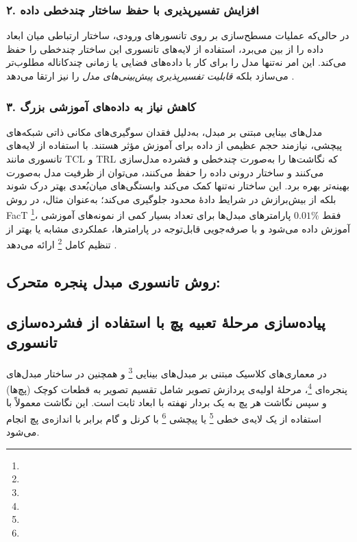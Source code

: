 \subsubsection{۲. \textbf{افزایش تفسیرپذیری با حفظ ساختار چندخطی داده}}

در حالی‌که عملیات مسطح‌سازی بر روی تانسورهای ورودی، ساختار ارتباطی میان ابعاد داده را از بین می‌برد، استفاده از لایه‌های تانسوری این ساختار چندخطی را حفظ می‌کند. این امر نه‌تنها مدل را برای کار با داده‌های فضایی یا زمانی چندکاناله مطلوب‌تر می‌سازد بلکه \emph{قابلیت تفسیرپذیری پیش‌بینی‌های مدل} را نیز ارتقا می‌دهد \cite{hamreras2025tensorization}.

\subsubsection{۳. \textbf{کاهش نیاز به داده‌های آموزشی بزرگ}}

مدل‌های بینایی مبتنی بر مبدل، به‌دلیل فقدان سوگیری‌های مکانی ذاتی شبکه‌های پیچشی، نیازمند حجم عظیمی از داده برای آموزش مؤثر هستند. با استفاده از لایه‌های تانسوری مانند TCL و TRL که نگاشت‌ها را به‌صورت چندخطی و فشرده مدل‌سازی می‌کنند و ساختار درونی داده را حفظ می‌کنند، می‌توان از ظرفیت مدل به‌صورت بهینه‌تر بهره برد. این ساختار نه‌تنها کمک می‌کند وابستگی‌های میان‌بُعدی بهتر درک شوند بلکه از بیش‌برازش در شرایط دادهٔ محدود جلوگیری می‌کند؛ به‌عنوان مثال، در روش FacT \footnote{}، فقط \(0.01\%\) پارامترهای مبدل‌ها برای تعداد بسیار کمی از نمونه‌های آموزشی آموزش داده می‌شود و با صرفه‌جویی قابل‌توجه در پارامترها، عملکردی مشابه یا بهتر از تنظیم کامل \footnote{} ارائه می‌دهد \cite{jie2022fact}.

\subsection{روش تانسوری مبدل پنجره متحرک:}

\subsection{پیاده‌سازی مرحلهٔ تعبیه پچ با استفاده از فشرده‌سازی تانسوری}

در معماری‌های کلاسیک مبتنی بر مبدل‌های بینایی \footnote{} و همچنین در ساختار مبدل‌های پنجره‌ای \footnote{}، مرحلهٔ اولیه‌ی پردازش تصویر شامل تقسیم تصویر به قطعات کوچک (پچ‌ها) و سپس نگاشت هر پچ به یک بردار نهفته با ابعاد ثابت است. این نگاشت معمولاً با استفاده از یک لایه‌ی خطی \footnote{} یا پیچشی \footnote{} با کرنل و گام برابر با اندازه‌ی پچ انجام می‌شود.

